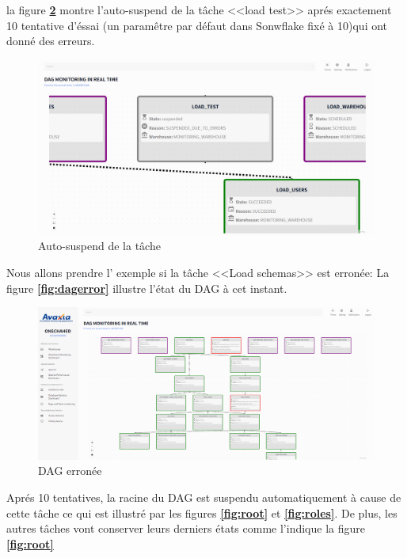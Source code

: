 \par la figure \textbf{\ref{fig:autosus}} montre l'auto-suspend de la tâche <<load test>> aprés exactement 10 tentative d'éssai (un paramêtre par défaut dans Sonwflake fixé à 10)qui ont donné des erreurs.
\begin{figure}[H]
    \centering
    \includegraphics[width =1\linewidth]{img/captures/dag/final/error.png}
    \caption{Auto-suspend de la tâche}
    \label{fig:autosus}
    \end{figure}
\par Nous allons prendre l' exemple si la tâche <<Load schemas>> est erronée:  La figure \textbf{\ref{fig:dagerror}} illustre l'état du DAG à cet instant. 
\begin{figure}[H]
    \centering
    \includegraphics[width =1\linewidth]{img/captures/dag/final/schemaerror.png}
    \caption{DAG erronée}
    \label{fig:autosus}
    \end{figure}
\par Aprés 10 tentatives, la racine du DAG est suspendu automatiquement à cause de cette tâche ce qui est illustré par les figures \textbf{\ref{fig:root}} et \textbf{\ref{fig:roles}}. De plus, les autres tâches vont conserver leurs derniers états comme l'indique la figure \textbf{\ref{fig:root}}
